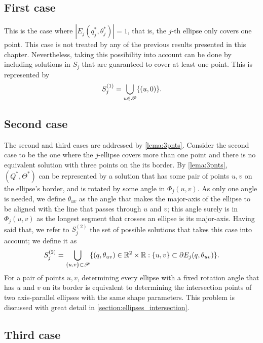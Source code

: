 \subsection{First case}

This is the case where $|E_j(q_j^*, \theta_j^*)|=1$, that is, the $j$-th ellipse only covers one point. 
This case is not treated by any of the previous results presented in this chapter. Nevertheless, taking this possibility into account can be done by including solutions in $S_j$ that are guaranteed to cover at least one point. This is represented by
\begin{equation}
	S_j^{(1)} = \bigcup_{u \in \mathscr{P}} \{(u, 0)\}.
\end{equation}

\subsection{Second case}

The second and third cases are addressed by \autoref{lema:3pnts}. 
Consider the second case to be the one where the $j$-ellipse covers more than one point and there is no equivalent solution with three points on the its border. 
By \autoref{lema:3pnts}, $(Q^*, \Theta^*)$ can be represented by a solution that has some pair of points $u, v$ on the ellipse's border, and is rotated by some angle in $\Phi_j(u,v)$. 
As only one angle is needed, we define $\theta_{uv}$ as the angle that makes the major-axis of the ellipse to be aligned with the line that passes through $u$ and $v$; this angle surely is in $\Phi_j(u,v)$ as the longest segment that crosses an ellipse is its major-axis.
Having said that, we refer to $S_j^{(2)}$ the set of possible solutions that takes this case into account; we define it as
\begin{equation}
S_j^{(2)} = \bigcup_{\{u, v\} \subset \mathscr{P}} \{(q, \theta_{uv})\in \mathbb{R}^2\times\mathbb{R}: \{u,v\} \subset \partial E_j(q, \theta_{uv})\}.\\
\end{equation}
For a pair of points $u, v$, determining every ellipse with a fixed rotation angle that has $u$ and $v$ on its border is equivalent to determining the intersection points of two axis-parallel ellipses with the same shape parameters. This problem is discussed with great detail in \autoref{section:ellipses_intersection}.

\subsection{Third case}

